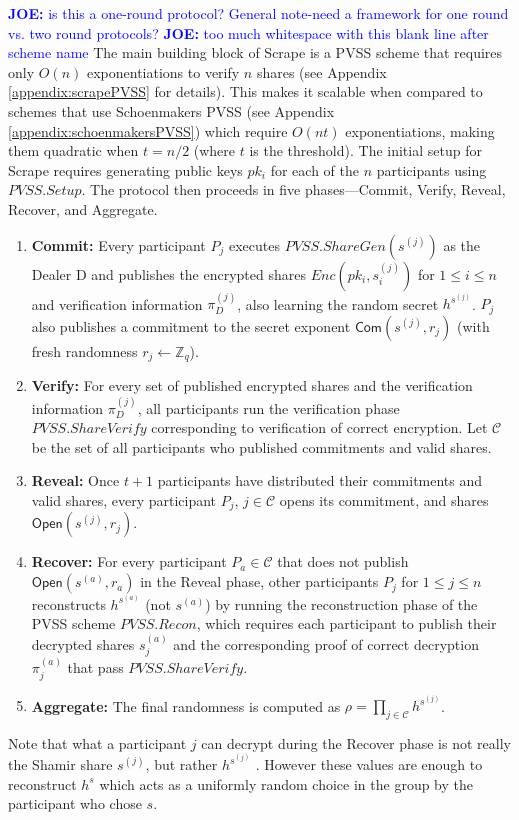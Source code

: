 \documentclass[letterpaper,twocolumn,10pt]{article}
\theoremstyle{definition}
\theoremstyle{remark}
\newcommand{\joenote}[1]{\textcolor{blue}{\textbf{JOE:} #1}}
\begin{document}
\joenote{is this a one-round protocol? General note-need a framework for one round vs. two round protocols?}
\joenote{too much whitespace with this blank line after scheme name}
The main building block of Scrape is a PVSS scheme that requires only $O(n)$ exponentiations to verify $n$ shares (see Appendix \ref{appendix:scrapePVSS} for details). This makes it scalable when compared to schemes that use Schoenmakers PVSS (see Appendix \ref{appendix:schoenmakersPVSS}) which require $O(n t)$ exponentiations, making them quadratic when $t = n/2$ (where $t$ is the threshold). The initial setup for Scrape requires generating public keys $pk_i$ for each of the $n$ participants using $PVSS.Setup$. 
  The protocol then proceeds in five phases---Commit, Verify, Reveal, Recover, and Aggregate.
\begin{enumerate}
\item \textbf{Commit:} Every participant $P_j$ executes $PVSS.ShareGen(s^{(j)})$ as the Dealer D and publishes the encrypted shares $Enc(pk_i, s^{(j)}_i)$ for $1 \le i \le n$ and verification information $\pi_D^{(j)}$, also learning the random secret $h^{s^{(j)}}$. $P_j$ also publishes a commitment to the secret exponent $\mathsf{Com}(s^{(j)}, r_j)$ (with fresh randomness $r_j \leftarrow \mathbb{Z}_q$).
\item \textbf{Verify:} For every set of published encrypted shares and the verification information $\pi_D^{(j)}$, all participants run the verification phase $PVSS.ShareVerify$ corresponding to verification of correct encryption. Let $\mathcal{C}$ be the set of all participants who published commitments and valid shares.
\item \textbf{Reveal:} Once $t+1$ participants have distributed their commitments and valid shares, every participant $P_j$, $j \in \mathcal{C}$ opens its commitment, and shares $\mathsf{Open}(s^{(j)}, r_j)$.
\item \textbf{Recover:} For every participant $P_a \in \mathcal{C}$ that does not publish $\mathsf{Open}(s^{(a)}, r_a)$ in the Reveal phase, other participants $P_j$ for $1 \leq j \leq n$ reconstructs $h^{s^{(a)}}$ (not $s^{(a)}$) by running the reconstruction phase of the PVSS scheme $PVSS.Recon$, which requires each participant to publish their decrypted shares $s_j^{(a)}$ and the corresponding proof of correct decryption $\pi_j^{(a)}$ that pass $PVSS.ShareVerify$.

\item \textbf{Aggregate:} The final randomness is computed as $\rho = \prod_{j \in \mathcal{C}} h^{s^{(j)}}$.
\end{enumerate}
Note that what a participant $j$ can decrypt during the Recover phase is not really the Shamir share $s^{(j)}$, but rather $h^{s^{(j)}}$ . However these values are enough to reconstruct $h^s$ which acts as a uniformly random choice in the group by the participant who chose $s$. \\
\end{document}
